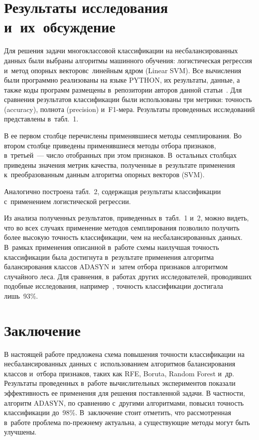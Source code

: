 \begin{multicols}{2}
\section{Результаты исследования и~их~обсуждение}
 
  Для решения задачи многоклассовой классификации на несбалансированных 
данных были вы\-бра\-ны алгоритмы машинного обучения: ло\-ги\-стическая 
регрессия и~метод опорных векторов\linebreak с~линейным ядром (Linear SVM). Все 
вычисления были программно реализованы на языке PYTHON, их результаты, 
данные, а также коды программ размещены в~репозитории авторов данной 
статьи~\cite{11-sev}. Для сравнения результатов классификации были 
использованы три метрики: точность (accuracy), полнота (precision) и~F1-ме\-ра. 
Результаты проведенных исследований представлены в~табл.~1.
  

  
  В ее первом столбце перечислены применявшиеся методы семплирования. 
Во втором столбце приведены применявшиеся методы отбора признаков, 
в~третьей~--- число отобранных при этом признаков. В~остальных столбцах 
приведены значения метрик качества, полученные в~результате применения 
к~преобразованным данным алгоритма опорных векторов (SVM). 

Аналогично 
построена табл.~2, содержащая результаты классификации с~применением 
логистической регрессии.
  
 
  
  Из анализа полученных результатов, приведенных в~табл.~1 и~2, можно 
видеть, что во всех случа\-ях применение методов семплирования позволило\linebreak 
получить более высокую точность классификации, чем на несбалансированных 
данных. В~рамках применения описанной в~работе схемы наилучшая точность 
классификации была достигнута в~результате применения алгоритма 
балансирования классов ADASYN и~затем отбора признаков алгоритмом 
случайного леса. Для сравнения, в~работах других исследователей, 
проводивших подобные исследования, например~\cite{9-sev, 10-sev}, точность 
классификации достигала лишь~93\%.
  
\section{Заключение}

  В настоящей работе предложена схема повышения точности классификации 
на несбалансированных данных с~использованием алгоритмов балансирования 
классов и~отбора признаков, таких как RFE, Boruta, Random Forest и~др. 
Результаты проведенных в~работе вычислительных экспериментов показали 
эффективность ее применения для решения поставленной задачи. В частности, 
алгоритм ADASYN, по сравнению с~другими алгоритмами, повысил точность 
классификации до~98\%. В~заключение стоит отметить, что рассмотренная 
в~работе проблема по-прежнему актуальна, а существующие методы могут 
быть улучшены.
  

\end{multicols}
